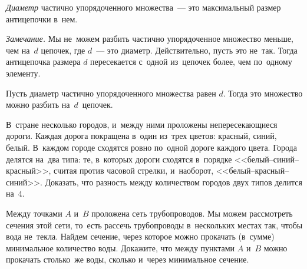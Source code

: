 \emph{Диаметр} частично упорядоченного множества~--- это максимальный размер
антицепочки в~нем.

\emph{Замечание.}
Мы не~можем разбить частично упорядоченное множество меньше, чем на~$d$
цепочек, где $d$~--- это диаметр.
Действительно, пусть это не~так.
Тогда антицепочка размера $d$ пересекается с~одной из~цепочек более, чем
по~одному элементу.

Пусть диаметр частично упорядоченного множества равен $d$.
Тогда это множество можно разбить на~$d$~цепочек.

\begin{problems}

\item
В~стране несколько городов, и~между ними проложены непересекающиеся дороги.
Каждая дорога покращена в~один из~трех цветов: красный, синий, белый.
В~каждом городе сходятся ровно по~одной дороге каждого цвета.
Города делятся на~два типа: те, в~которых дороги сходятся в~порядке
<<белый--синий--красный>>, считая против часовой стрелки, и~наоборот,
<<белый--красный--синий>>.
Доказать, что разность между количеством городов двух типов делится на~$4$.

\item
Между точками $A$ и~$B$ проложена сеть трубопроводов.
Мы можем рассмотреть сечения этой сети, то~есть рассечь трубопроводы
в~нескольких местах так, чтобы вода не~текла.
Найдем сечение, через которое можно прокачать (в~сумме) минимальное количество
воды.
Докажите, что между пунктами $A$ и~$B$ можно прокачать столько~же воды, сколько
и~через минимальное сечение.

\end{problems}

